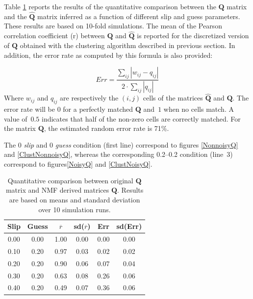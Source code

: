 Table \ref{tab:wq-comp} reports the results of the quantitative comparison between the $\mathbf{Q}$ matrix and the $\hat{\mathbf{Q}}$ matrix inferred as a function of different slip and guess parameters. These results are based on 10-fold simulations. The mean of the Pearson correlation coefficient (r) between $\mathbf{Q}$ and $\hat{\mathbf{Q}}$ is reported for the discretized version of $\hat{\mathbf{Q}}$ obtained with the clustering algorithm described in previous section. In addition, the error rate as computed by this formula is also provided:

\begin{equation}
  Err = \frac{\sum_{ij} |w_{ij} - q_{ij}| }{2 \cdot \sum_{ij} |q_{ij}| }
\end{equation}
Where $w_{ij}$ and $q_{ij}$ are respectively the $(i,j)$ cells of the matrices $\hat{\mathbf{Q}}$ and $\mathbf{Q}$.  The error rate will be $0$ for a perfectly matched $\mathbf{Q}$ and~$1$ when no cells match.  A value of~$0.5$ indicates that half of the non-zero cells are correctly matched. For the matrix $\mathbf{Q}$, the estimated random error rate is 71\%.

The 0 \textit{slip} and 0 \textit{guess} condition (first line) correspond to figures \ref{NonnoisyQ} and \ref{ClustNonnoisyQ}, whereas the corresponding 0.2--0.2 condition (line~3) correspond to figures\ref{NoisyQ}  and \ref{ClustNoisyQ}.



\newcommand{\ha}[2]{\multicolumn{#1}{c}{\textbf{#2}}}
\newcommand{\hb}[1]{\ha{1}{#1}}
\begin{table}
  \caption{Quantitative comparison between original $\mathbf{Q}$ matrix and NMF derived matrices $\hat{\mathbf{Q}}$.  Results are based on means and standard deviation over 10 simulation runs.}
  \begin{center}
  \begin{tabular}{cccccc}
    \hline
 \hb{Slip} & \hb{Guess} & \hb{$\overline{r}$} & \hb{sd($\overline{r}$)} & \hb{Err} & \hb{sd(Err)} \\ 
  \hline
0.00 & 0.00 & 1.00 & 0.00 & 0.00 & 0.00 \\ 
0.10 & 0.20 & 0.97 & 0.03 & 0.02 & 0.02 \\ 
0.20 & 0.20 & 0.90 & 0.06 & 0.07 & 0.04 \\ 
0.30 & 0.20 & 0.63 & 0.08 & 0.26 & 0.06 \\ 
0.40 & 0.20 & 0.49 & 0.07 & 0.36 & 0.06 \\ 
  \hline
  \end{tabular}
  \end{center}

\label{tab:wq-comp}
\end{table}

